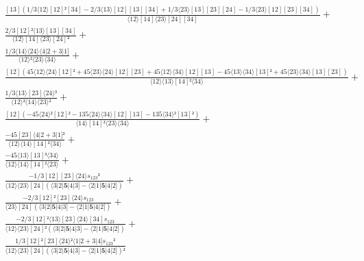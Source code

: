 \documentclass[varwidth, border=5pt]{standalone}
\begin{document}
\begin{my}
$\begin{gathered}
\scriptscriptstyle\frac{[13](1/3⟨12⟩[12]²[34]-2/3⟨13⟩[12][13][34]+1/3⟨23⟩[13][23][24]-1/3⟨23⟩[12][23][34])}{⟨12⟩[14]⟨23⟩[24][34]} +\\
\scriptscriptstyle\frac{2/3[12]²⟨13⟩[13][34]}{⟨12⟩[14]⟨23⟩[24]²} +\\
\scriptscriptstyle\frac{1/3⟨14⟩⟨24⟩⟨4|2+3|1]}{⟨12⟩²⟨23⟩⟨34⟩} +\\
\scriptscriptstyle\frac{[12](45⟨12⟩⟨24⟩[12]²+45⟨23⟩⟨24⟩[12][23]+45⟨12⟩⟨34⟩[12][13]-45⟨13⟩⟨34⟩[13]²+45⟨23⟩⟨34⟩[13][23])}{⟨12⟩⟨13⟩[14]²⟨34⟩} +\\
\scriptscriptstyle\frac{1/3⟨13⟩[23]⟨24⟩³}{⟨12⟩²⟨14⟩⟨23⟩²} +\\
\scriptscriptstyle\frac{[12](-45⟨24⟩²[12]²-135⟨24⟩⟨34⟩[12][13]-135⟨34⟩²[13]²)}{⟨14⟩[14]²⟨23⟩⟨34⟩} +\\
\scriptscriptstyle\frac{-45[23]⟨4|2+3|1]²}{⟨12⟩⟨14⟩[14]²⟨34⟩} +\\
\scriptscriptstyle\frac{-45⟨13⟩[13]³⟨34⟩}{⟨12⟩⟨14⟩[14]²⟨23⟩} +\\
\scriptscriptstyle\frac{-1/3[12][23]⟨24⟩s_{123}²}{⟨12⟩⟨23⟩[24](⟨3|2|𝟓|4|3]-⟨2|1|𝟓|4|2])} +\\
\scriptscriptstyle\frac{-2/3[12]²[23]⟨24⟩s_{123}}{⟨23⟩[24](⟨3|2|𝟓|4|3]-⟨2|1|𝟓|4|2])} +\\
\scriptscriptstyle\frac{-2/3[12]²⟨13⟩[23]⟨24⟩[34]s_{123}}{⟨12⟩⟨23⟩[24]²(⟨3|2|𝟓|4|3]-⟨2|1|𝟓|4|2])} +\\
\scriptscriptstyle\frac{1/3[12]²[23]⟨24⟩²⟨1|2+3|4]s_{123}²}{⟨12⟩⟨23⟩[24](⟨3|2|𝟓|4|3]-⟨2|1|𝟓|4|2])²} \phantom{+}
\end{gathered}$
\end{my}
\end{document}

